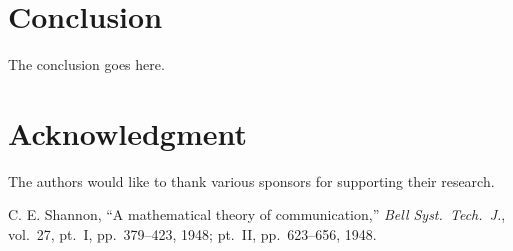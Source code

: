 \documentclass[10pt,conference]{IEEEtran}
\begin{document}
%


\section{Conclusion}
The conclusion goes here.


\section*{Acknowledgment}
The authors would like to thank various sponsors for supporting their research. 



%
%
%
\begin{thebibliography}{1}


C. E. Shannon, ``A mathematical theory of communication,''
\emph{Bell Syst.\ Tech.\ J.}, vol.\ 27, pt.~I, pp.~379--423, 1948;
     pt.~II, pp.~623--656, 1948.


\end{thebibliography}
\end{document}
